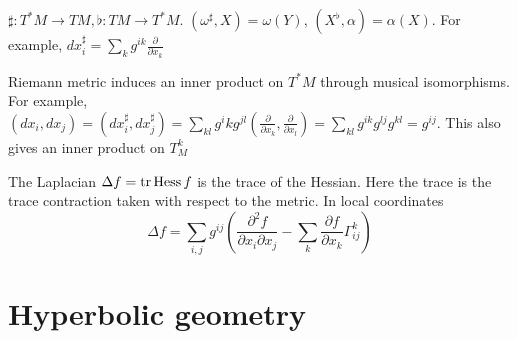 \documentclass[main]{subfiles}
\begin{document}
\begin{definition}
$\sharp:T^*M\to TM, \flat:TM\to T^*M$. $(\omega^\sharp,X)=\omega(Y)$, $(X^\flat,\alpha)=\alpha(X)$. For example, $dx_i^\sharp=\sum_kg^{ik}\frac{\partial}{\partial x_k}$
\end{definition}

Riemann metric induces an inner product on $T^*M$ through musical isomorphisms. For example, $(dx_i,dx_j)=(dx_i^\sharp,dx_j^\sharp)=\sum_{kl}g^ikg^{jl}\left(\frac{\partial}{\partial x_k},\frac{\partial}{\partial x_l}\right)=\sum_{kl}g^{ik}g^{lj}g^{kl}=g^{ij}$. This also gives an inner product on $T^k_M$

\begin{definition}
The Laplacian $\Delta f=\operatorname{tr}\operatorname{Hess} f$ is the trace of the Hessian. Here the trace is the trace contraction taken with respect to the metric. In local coordinates
\[\Delta f=\sum_{i,j}g^{ij}\left(\frac{\partial^2f}{\partial x_i\partial x_j}-\sum_{k}\frac{\partial f}{\partial x_k}\Gamma_{ij}^k\right)\]
\end{definition}



\section{Hyperbolic geometry}
\end{document}
